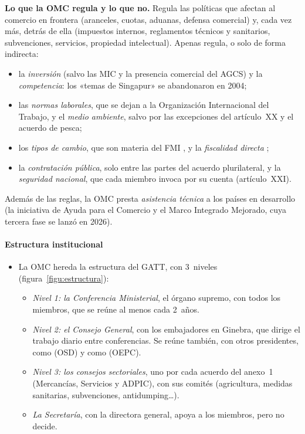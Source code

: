 \documentclass[11pt]{article}
\begin{document}
\begin{anotaciones}
\textbf{Lo que la OMC regula y lo que no.} Regula las políticas que afectan al comercio en frontera (aranceles, cuotas, aduanas, defensa comercial) y, cada vez más, detrás de ella (impuestos internos, reglamentos técnicos y sanitarios, subvenciones, servicios, propiedad intelectual). Apenas regula, o solo de forma indirecta:
\begin{itemize}
\item la \emph{inversión} (salvo las MIC y la presencia comercial del AGCS) y la \emph{competencia}: los «temas de Singapur» se abandonaron en 2004;
\item las \emph{normas laborales}, que se dejan a la Organización Internacional del Trabajo, y el \emph{medio ambiente}, salvo por las excepciones del artículo~XX y el acuerdo de pesca;
\item los \emph{tipos de cambio}, que son materia del FMI , y la \emph{fiscalidad directa} ;
\item la \emph{contratación pública}, solo entre las partes del acuerdo plurilateral, y la \emph{seguridad nacional}, que cada miembro invoca por su cuenta (artículo~XXI).
\end{itemize}
Además de las reglas, la OMC presta \emph{asistencia técnica} a los países en desarrollo (la iniciativa de Ayuda para el Comercio y el Marco Integrado Mejorado, cuya tercera fase se lanzó en 2026)\nocite{OMC2026CG0714}.
\end{anotaciones}

\paragraph{Estructura institucional}

\begin{itemize}
\item La OMC hereda la estructura del GATT, con 3~niveles (figura~\ref{figu:estructura}):
  \begin{itemize}
  \item \emph{Nivel 1: la Conferencia Ministerial}, el órgano supremo, con todos los miembros, que se reúne al menos cada 2~años.
  \item \emph{Nivel 2: el Consejo General}, con los embajadores en Ginebra, que dirige el trabajo diario entre conferencias. Se reúne también, con otros presidentes, como  (OSD) y como  (OEPC).
  \item \emph{Nivel 3: los consejos sectoriales}, uno por cada acuerdo del anexo~1 (Mercancías, Servicios y ADPIC), con sus comités (agricultura, medidas sanitarias, subvenciones, antidumping\ldots).
  \item \emph{La Secretaría}, con la directora general, apoya a los miembros, pero no decide.
  \end{itemize}
\end{itemize}
\end{document}
